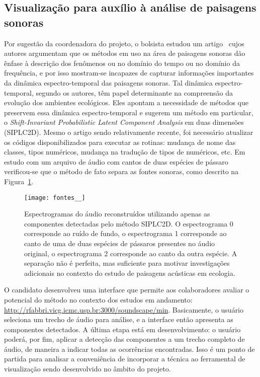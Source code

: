 \documentclass[a4paper, 11pt]{article}
\begin{document}
\subsection{Visualização para auxílio à análise de paisagens sonoras}\label{pa}
Por sugestão da coordenadora do projeto,
o bolsista estudou um artigo~\cite{eld} cujos autores argumentam que os métodos em uso na área de paisagens sonoras dão ênfase à descrição dos fenômenos ou no domínio do tempo ou no domínio da frequência, e por isso mostram-se incapazes de capturar informações importantes da dinâmica espectro-temporal das paisagens sonoras. Tal dinâmica espectro-temporal, segundo os autores, têm papel determinante na compreensão da evolução dos ambientes ecológicos.
Eles apontam a necessidade de métodos que preservem essa dinâmica espectro-temporal e sugerem um método em particular, o \emph{Shift-Invariant Probabilistic Latent Component Analysis} em duas dimensões (SIPLC2D).
Mesmo o artigo sendo relativamente recente, foi necessário atualizar os códigos disponibilizados para executar as rotinas: mudança de nome das classes, tipos numéricos, mudança na tradução de tipos de numéricos, etc.
Em estudo com um arquivo de áudio com cantos de duas espécies de pássaro verificou-se que o método de fato separa as fontes sonoras, como descrito na Figura~\ref{ps}.
\begin{figure}[h!]
\centering
  \texttt{[image: fontes\_\_]}
\caption{%
  Espectrogramas do áudio reconstruídos utilizando apenas
  as componentes detectadas pelo método SIPLC2D.
  O espectrograma 0 corresponde ao ruído de fundo,
  o espectrograma 1 corresponde ao canto de uma de duas espécies de pássaros
  presentes no áudio original,
  o espectrograma 2 corresponde ao canto da outra espécie.
  A separação não é perfeita, mas suficiente para motivar investigações adicionais no contexto do estudo de paisagens acústicas em ecologia.
}\label{ps}
\end{figure}

O candidato desenvolveu uma interface que permite aos colaboradores avaliar o potencial do método no contexto dos estudos em andamento: \url{http://rfabbri.vicg.icmc.usp.br:3000/soundscape/min}.
Basicamente, o usuário seleciona um trecho de áudio para análise, e a interface
então apresenta as componentes detectados.
A última etapa está em desenvolvimento: o usuário poderá,
por fim, aplicar a detecção das componentes a um trecho completo de áudio,
de maneira a indicar todas as ocorrências encontradas.
Isso é um ponto de partida para analisar a conveniência de incorporar a técnica ao ferramental de visualização sendo desenvolvido no âmbito do projeto.
\end{document}
